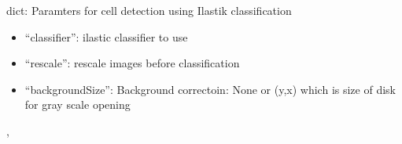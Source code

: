 \documentclass[letterpaper,10pt,english]{sphinxmanual}
\begin{document}

\begin{fulllineitems}
\label{api/ClearMap.Parameter:ClearMap.Parameter.IlastikParameter}
dict: Paramters for cell detection using Ilastik classification
\begin{itemize}
\item {} 
``classifier'': ilastic classifier to use

\item {} 
``rescale'': rescale images before classification

\item {} 
``backgroundSize'': Background correctoin: None or (y,x) which is size of disk for gray scale opening

\end{itemize}




{\hyperref[api/ClearMap.Parameter:ClearMap.Parameter.SpotDetectionParameter]{\emph{}}}, {\hyperref[api/ClearMap.Parameter:ClearMap.Parameter.StackProcessingParameter]{\emph{}}}



\end{fulllineitems}

\end{document}
